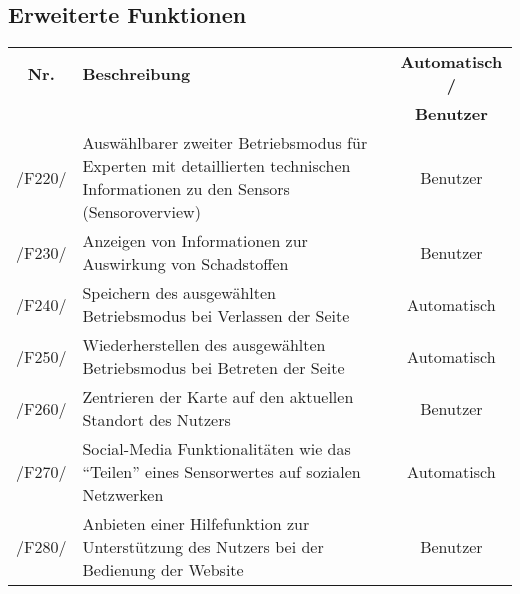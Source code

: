 \subsection{Erweiterte Funktionen}
\begin{tabularx}{\textwidth}{| c | X | c |}
\hline
        \textbf{Nr.} & 
        \textbf{Beschreibung} & 
        \textbf{Automatisch /} \\
        & & \textbf{Benutzer} \\
        \hline
        /F220/ & Auswählbarer zweiter Betriebsmodus für Experten mit detaillierten technischen Informationen zu den \glspl{Sensor} (\gls{Sensoroverview}) & Benutzer \\
        \hline
        /F230/ & Anzeigen von Informationen zur Auswirkung von Schadstoffen & Benutzer \\
        \hline
        /F240/ & Speichern des ausgewählten Betriebsmodus bei Verlassen der Seite & Automatisch \\
        \hline
        /F250/ & Wiederherstellen des ausgewählten Betriebsmodus bei Betreten der Seite & Automatisch \\
        \hline
        /F260/ & Zentrieren der Karte auf den aktuellen Standort des Nutzers & Benutzer \\
        \hline
        /F270/ & Social-Media Funktionalitäten wie das \enquote{Teilen} eines Sensorwertes auf sozialen Netzwerken & Automatisch \\
        \hline
        /F280/ & Anbieten einer Hilfefunktion zur Unterstützung des Nutzers bei der Bedienung der Website & Benutzer \\
        \hline
\end{tabularx}
